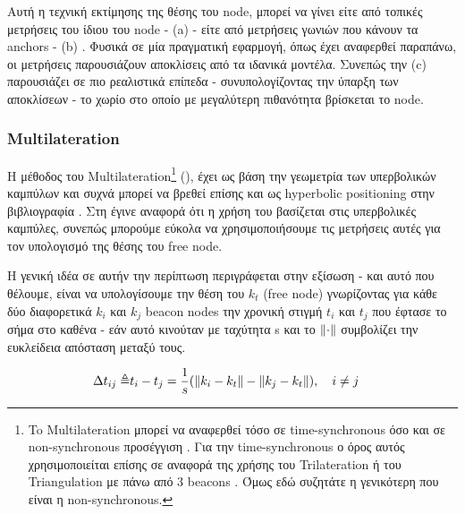 Αυτή η τεχνική εκτίμησης της θέσης του node, μπορεί να γίνει είτε από τοπικές μετρήσεις του ίδιου του node -
 (a) - είτε από μετρήσεις γωνιών που κάνουν τα anchors -  (b)
\cite{wsn-Localization-systems}. Φυσικά σε μία πραγματική εφαρμογή, όπως έχει αναφερθεί παραπάνω, οι μετρήσεις παρουσιάζουν αποκλίσεις 
από τα ιδανικά μοντέλα. Συνεπώς την  (c) παρουσιάζει σε πιο ρεαλιστικά επίπεδα - συνυπολογίζοντας την ύπαρξη 
των αποκλίσεων - 
το χωρίο στο οποίο με μεγαλύτερη πιθανότητα βρίσκεται το node.

\subsubsection{Multilateration} \label{sec:Multilateration}
Η μέθοδος του Multilateration\footnote{To Multilateration μπορεί να αναφερθεί τόσο σε time-synchronous όσο και σε non-synchronous προσέγγιση \cite{multilateration-based-on-timing}. Για την time-synchronous ο όρος αυτός χρησιμοποιείται επίσης σε αναφορά της χρήσης του Trilateration ή του Triangulation με πάνω από 3 beacons \cite{wsn-Localization-systems} \cite{triangulation-simple-equation}. Όμως εδώ συζητάτε η γενικότερη που είναι  η non-synchronous.} (), 
έχει ως βάση την γεωμετρία των υ\-πε\-ρβο\-λι\-κών καμπύλων και συχνά μπορεί να βρεθεί επίσης και ως hyperbolic positioning 
στην βιβλιογραφία \cite{multilateration-def} \cite{triangulation-trilateration-multilateration} \cite{wikipedia-multilateration}. Στη  
έγινε αναφορά ότι η χρήση του  βασίζεται στις υπερβολικές καμπύλες, συνεπώς μπορούμε εύκολα να χρησιμοποιήσουμε
τις μετρήσεις αυτές για τον υπολογισμό της θέσης του free node.

Η γενική ιδέα σε αυτήν την περίπτωση περιγράφεται στην εξίσωση  \cite{wsn-Localization-techniques} \cite{simple-tdoa} - και αυτό που 
θέλουμε, είναι να υπολογίσουμε την θέση του $k_t$ (free node) γνωρίζοντας για κάθε δύο διαφορετικά $k_i$ και $k_j$ beacon nodes
την χρονική στιγμή $t_i$ και $t_j$ που έφτασε το σήμα στο καθένα - εάν αυτό κινούταν με ταχύτητα s και το $\left\lVert\cdot\right\rVert$ συμβολίζει την ευκλείδεια
απόσταση μεταξύ τους.

\begin{align}
	\Delta t_{ij} \triangleq & t_i - t_j = \frac{1}{s} (\left\lVert k_i - k_t\right\rVert - \left\lVert k_j - k_t\right\rVert), \quad i \neq j\label{eq:tdoa-multiple}
\end{align}


